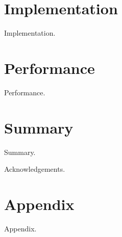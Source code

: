 \documentclass[sigchi]{acmart}
\begin{document}
\section{Implementation}
Implementation.

\section{Performance}
Performance.

\section{Summary}
Summary.

\begin{acks}
Acknowledgements.
\end{acks}




\appendix

\section{Appendix}

Appendix.
\end{document}
